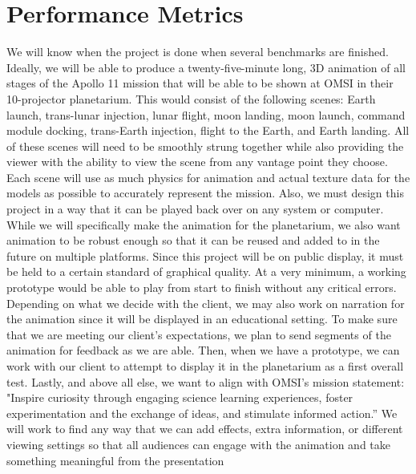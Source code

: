 \documentclass[onecolumn, draftclsnofoot,10pt, compsoc]{IEEEtran}
\begin{document}
\section{Performance Metrics}
We will know when the project is done when several benchmarks are finished. Ideally, we will be able to produce a twenty-five-minute long, 3D animation of all stages of the Apollo 11 mission that will be able to be shown at OMSI in their 10-projector planetarium. This would consist of the following scenes: Earth launch, trans-lunar injection, lunar flight, moon landing, moon launch, command module docking, trans-Earth injection, flight to the Earth, and Earth landing. All of these scenes will need to be smoothly strung together while also providing the viewer with the ability to view the scene from any vantage point they choose. Each scene will use as much physics for animation and actual texture data for the models as possible to accurately represent the mission. Also, we must design this project in a way that it can be played back over on any system or computer. While we will specifically make the animation for the planetarium, we also want animation to be robust enough so that it can be reused and added to in the future on multiple platforms.
\newline
\newline
Since this project will be on public display, it must be held to a certain standard of graphical quality. At a very minimum, a working prototype would be able to play from start to finish without any critical errors. Depending on what we decide with the client, we may also work on narration for the animation since it will be displayed in an educational setting. To make sure that we are meeting our client's expectations, we plan to send segments of the animation for feedback as we are able. Then, when we have a prototype, we can work with our client to attempt to display it in the planetarium as a first overall test. Lastly, and above all else, we want to align with OMSI’s mission statement: "Inspire curiosity through engaging science learning experiences, foster experimentation and the exchange of ideas, and stimulate informed action.” We will work to find any way that we can add effects, extra information, or different viewing settings so that all audiences can engage with the animation and take something meaningful from the presentation
\end{document}
